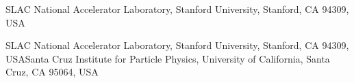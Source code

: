 %
%
%

\newcommand*{\SLAC}{SLAC National Accelerator Laboratory, Stanford University, Stanford, CA 94309, USA}
\newcommand*{\SLACindex}{49}
\newcommand*{\UCSC}{Santa Cruz Institute for Particle Physics, University of California, Santa Cruz, CA 95064, USA}
\newcommand*{\UCSCindex}{50}

\author{M.~Solt}\affiliation\SLAC
\author{O.~Moreno}\affiliation\SLAC\affiliation\UCSC
